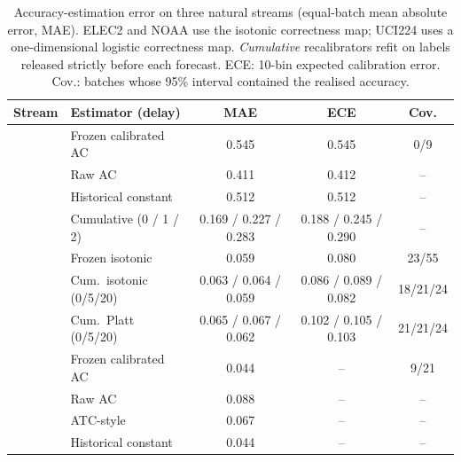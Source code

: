 \begin{table}[t]
\centering
\caption{Accuracy-estimation error on three natural streams (equal-batch mean absolute error, MAE). ELEC2 and NOAA use the isotonic correctness map; UCI224 uses a one-dimensional logistic correctness map. \emph{Cumulative} recalibrators refit on labels released strictly before each forecast. ECE: 10-bin expected calibration error. Cov.: batches whose 95\% interval contained the realised accuracy.}
\label{tab:external}
\setlength{\tabcolsep}{3.5pt}
\begin{tabular}{llccc}
\toprule
Stream & Estimator (delay) & MAE & ECE & Cov. \\
\midrule
{} & Frozen calibrated AC & 0.545 & 0.545 & 0/9 \\
 & Raw AC & 0.411 & 0.412 & -- \\
 & Historical constant & 0.512 & 0.512 & -- \\
 & Cumulative (0 / 1 / 2) & 0.169 / 0.227 / 0.283 & 0.188 / 0.245 / 0.290 & -- \\
\midrule
{} & Frozen isotonic & 0.059 & 0.080 & 23/55 \\
 & Cum.\ isotonic (0/5/20) & 0.063 / 0.064 / 0.059 & 0.086 / 0.089 / 0.082 & 18/21/24 \\
 & Cum.\ Platt (0/5/20) & 0.065 / 0.067 / 0.062 & 0.102 / 0.105 / 0.103 & 21/21/24 \\
\midrule
{} & Frozen calibrated AC & 0.044 & -- & 9/21 \\
 & Raw AC & 0.088 & -- & -- \\
 & ATC-style & 0.067 & -- & -- \\
 & Historical constant & 0.044 & -- & -- \\
\bottomrule
\end{tabular}
\end{table}
